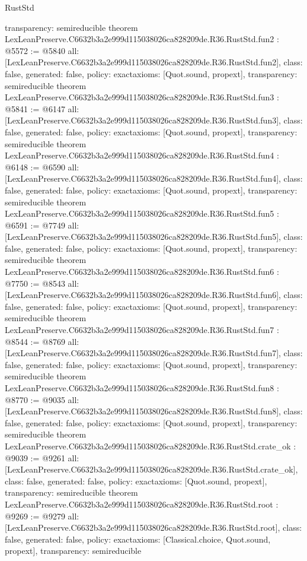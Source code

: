 \begin{lexlean}{RustStd}
\begin{coremodule}
{  transparency: semireducible
}
theorem LexLeanPreserve.C6632b3a2e999d115038026ca828209de.R36.RustStd.fun2 : @5572 := @5840 {
  all: [LexLeanPreserve.C6632b3a2e999d115038026ca828209de.R36.RustStd.fun2],
  class: false,
  generated: false,
  policy: exact{axioms: [Quot.sound, propext]},
  transparency: semireducible
}
theorem LexLeanPreserve.C6632b3a2e999d115038026ca828209de.R36.RustStd.fun3 : @5841 := @6147 {
  all: [LexLeanPreserve.C6632b3a2e999d115038026ca828209de.R36.RustStd.fun3],
  class: false,
  generated: false,
  policy: exact{axioms: [Quot.sound, propext]},
  transparency: semireducible
}
theorem LexLeanPreserve.C6632b3a2e999d115038026ca828209de.R36.RustStd.fun4 : @6148 := @6590 {
  all: [LexLeanPreserve.C6632b3a2e999d115038026ca828209de.R36.RustStd.fun4],
  class: false,
  generated: false,
  policy: exact{axioms: [Quot.sound, propext]},
  transparency: semireducible
}
theorem LexLeanPreserve.C6632b3a2e999d115038026ca828209de.R36.RustStd.fun5 : @6591 := @7749 {
  all: [LexLeanPreserve.C6632b3a2e999d115038026ca828209de.R36.RustStd.fun5],
  class: false,
  generated: false,
  policy: exact{axioms: [Quot.sound, propext]},
  transparency: semireducible
}
theorem LexLeanPreserve.C6632b3a2e999d115038026ca828209de.R36.RustStd.fun6 : @7750 := @8543 {
  all: [LexLeanPreserve.C6632b3a2e999d115038026ca828209de.R36.RustStd.fun6],
  class: false,
  generated: false,
  policy: exact{axioms: [Quot.sound, propext]},
  transparency: semireducible
}
theorem LexLeanPreserve.C6632b3a2e999d115038026ca828209de.R36.RustStd.fun7 : @8544 := @8769 {
  all: [LexLeanPreserve.C6632b3a2e999d115038026ca828209de.R36.RustStd.fun7],
  class: false,
  generated: false,
  policy: exact{axioms: [Quot.sound, propext]},
  transparency: semireducible
}
theorem LexLeanPreserve.C6632b3a2e999d115038026ca828209de.R36.RustStd.fun8 : @8770 := @9035 {
  all: [LexLeanPreserve.C6632b3a2e999d115038026ca828209de.R36.RustStd.fun8],
  class: false,
  generated: false,
  policy: exact{axioms: [Quot.sound, propext]},
  transparency: semireducible
}
theorem LexLeanPreserve.C6632b3a2e999d115038026ca828209de.R36.RustStd.crate_ok : @9039 := @9261 {
  all: [LexLeanPreserve.C6632b3a2e999d115038026ca828209de.R36.RustStd.crate_ok],
  class: false,
  generated: false,
  policy: exact{axioms: [Quot.sound, propext]},
  transparency: semireducible
}
theorem LexLeanPreserve.C6632b3a2e999d115038026ca828209de.R36.RustStd.root : @9269 := @9279 {
  all: [LexLeanPreserve.C6632b3a2e999d115038026ca828209de.R36.RustStd.root],
  class: false,
  generated: false,
  policy: exact{axioms: [Classical.choice, Quot.sound, propext]},
  transparency: semireducible
}


\end{coremodule}
\end{lexlean}
